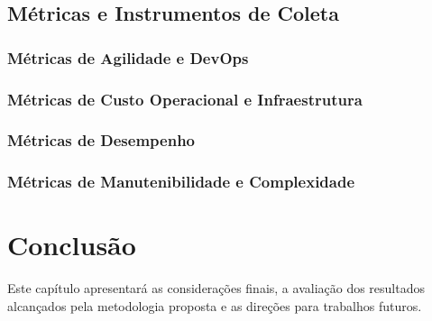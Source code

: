 \section{Métricas e Instrumentos de Coleta}
\label{sec:metricas_coleta}

\subsection{Métricas de Agilidade e DevOps}

\subsection{Métricas de Custo Operacional e Infraestrutura}

\subsection{Métricas de Desempenho}

\subsection{Métricas de Manutenibilidade e Complexidade}


\chapter{Conclusão}

Este capítulo apresentará as considerações finais, a avaliação dos resultados alcançados pela metodologia proposta e as direções para trabalhos futuros.

